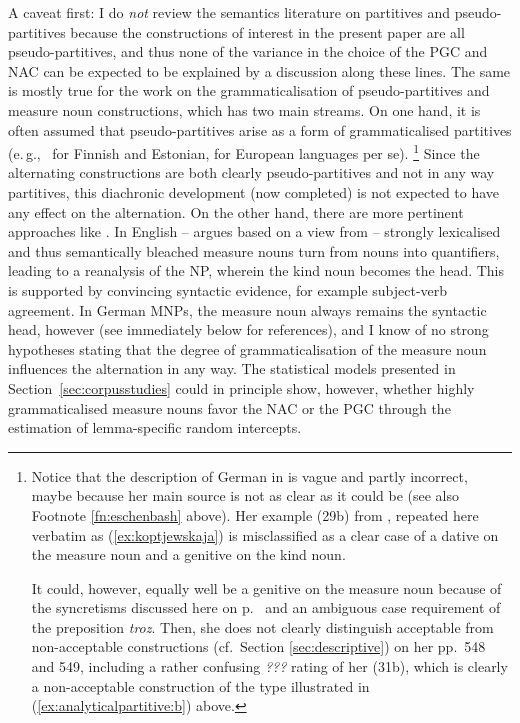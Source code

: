\documentclass[USenglish]{article}
\newcommand{\eg}{e.\,g.,}
\begin{document}
A caveat first:
I do \textit{not} review the semantics literature on partitives and pseudo-partitives because the constructions of interest in the present paper are all pseudo-partitives, and thus none of the variance in the choice of the PGC and NAC can be expected to be explained by a discussion along these lines.
The same is mostly true for the work on the grammaticalisation of pseudo-partitives and measure noun constructions, which has two main streams.
On one hand, it is often assumed that pseudo-partitives arise as a form of grammaticalised partitives (\eg\ \citealp[536--539]{Koptjevskaja2001} for Finnish and Estonian, \citealp[559]{Koptjevskaja2001} for European languages per se).%
\footnote{Notice that the description of German in \citet[547--549]{Koptjevskaja2001} is vague and partly incorrect, maybe because her main source \cite{Eschenbach1993} is not as clear as it could be (see also Footnote \ref{fn:eschenbash} above).
Her example (29b) from \citet[71]{Eschenbach1993}, repeated here verbatim as (\ref{ex:koptjewskaja}) is misclassified as a clear case of a dative on the measure noun and a genitive on the kind noun.

\begin{exe}
\end{exe}

It could, however, equally well be a genitive on the measure noun because of the syncretisms discussed here on p.\ \pageref{page:femininesyncretism} and an ambiguous case requirement of the preposition \textit{troz}.
Then, she does not clearly distinguish acceptable from non-acceptable constructions (cf.\ Section \ref{sec:descriptive}) on her pp.\ 548 and 549, including a rather confusing \textit{???} rating of her (31b), which is clearly a non-acceptable construction of the type illustrated in (\ref{ex:analyticalpartitive:b}) above.
}
Since the alternating constructions are both clearly pseudo-partitives and not in any way partitives, this diachronic development (now completed) is not expected to have any effect on the alternation.
On the other hand, there are more pertinent approaches like \cite{Brems2003,DeclerckBrems2016}.
In English -- \cite{Brems2003} argues based on a view from \cite{Langacker1991} -- strongly lexicalised and thus semantically bleached measure nouns turn from nouns into quantifiers, leading to a reanalysis of the NP, wherein the kind noun becomes the head.
This is supported by convincing syntactic evidence, for example subject-verb agreement.
In German MNPs, the measure noun always remains the syntactic head, however (see immediately below for references), and I know of no strong hypotheses stating that the degree of grammaticalisation of the measure noun influences the alternation in any way.
The statistical models presented in Section~\ref{sec:corpusstudies} could in principle show, however, whether highly grammaticalised measure nouns favor the NAC or the PGC through the estimation of lemma-specific random intercepts.
\end{document}
